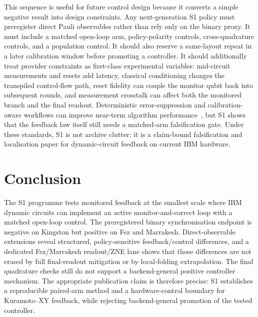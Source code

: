 \documentclass[preprint,aps,physrev,superscriptaddress,floatfix,longbibliography]{revtex4-2}
\begin{document}
This sequence is useful for future control design because it converts a
simple negative result into design constraints. Any next-generation S1 policy
must preregister direct Pauli observables rather than rely only on the binary
proxy. It must include a matched open-loop arm, policy-polarity controls,
cross-quadrature controls, and a population control. It should also reserve a
same-layout repeat in a later calibration window before promoting a
controller. It should additionally treat provider constraints as first-class
experimental variables: mid-circuit measurements and resets add latency,
classical conditioning changes the transpiled control-flow path, reset
fidelity can couple the monitor qubit back into subsequent rounds, and
measurement crosstalk can affect both the monitored branch and the final
readout. Deterministic error-suppression and calibration-aware workflows can
improve near-term algorithm performance~\cite{Mundada2023}, but S1 shows that
the feedback law itself still needs a matched-arm falsification gate. Under
these standards, S1 is not archive clutter: it is a claim-bound falsification
and localisation paper for dynamic-circuit feedback on current IBM hardware.

\section{Conclusion}

The S1 programme tests monitored feedback at the smallest scale where IBM
dynamic circuits can implement an active monitor-and-correct loop with a
matched open-loop control. The preregistered binary synchronisation endpoint
is negative on Kingston but positive on Fez and Marrakesh. Direct-observable
extensions reveal structured, policy-sensitive feedback/control differences,
and a dedicated Fez/Marrakesh readout/ZNE lane shows that those differences
are not erased by full final-readout mitigation or by local-folding
extrapolation. The final quadrature checks still do not support a
backend-general positive controller mechanism. The appropriate publication
claim is therefore precise: S1 establishes a reproducible paired-arm method
and a hardware-control boundary for Kuramoto--XY feedback, while rejecting
backend-general promotion of the tested controller.



\end{document}
